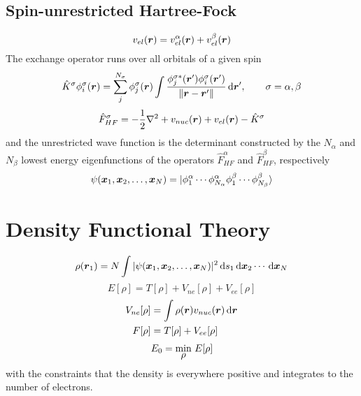 \subsection{Spin-unrestricted Hartree-Fock}
\begin{equation}
    v_{el}(\boldsymbol r) = v_{el}^\alpha (\boldsymbol r) + v_{el}^\beta (\boldsymbol r)
\end{equation}
The exchange operator runs over all orbitals of a given spin
\begin{equation}
    \hat{K}^\sigma\phi_i^\sigma(\boldsymbol r) 
	= \sum_j^{N_\sigma} \phi_j^\sigma (\boldsymbol r) 
	    \int \frac{\phi_j^{\sigma\ast}(\boldsymbol r')\phi_i^\sigma(\boldsymbol r')}
	    {\|\boldsymbol r - \boldsymbol r'\|} \,\mathrm{d} \boldsymbol r', \qquad \sigma = \alpha, \beta
\end{equation}
\begin{equation}
    \hat{F}_{HF}^\sigma = -\frac{1}{2}\nabla^2 + v_{nuc}(\boldsymbol r) + v_{el}(\boldsymbol r) - \hat{K}^\sigma 
\end{equation}
and the unrestricted wave function is the determinant constructed by the $N_\alpha$ and 
$N_\beta$ lowest energy eigenfunctions of the operators $\hat{F}_{HF}^\alpha$ and 
$\hat{F}_{HF}^\beta$, respectively
\begin{equation}
    \psi(\boldsymbol x_1,\boldsymbol x_2,\dots,\boldsymbol x_N) = 
    |\phi_1^\alpha\cdots\phi_{N_\alpha}^\alpha\phi_1^\beta\cdots\phi_{N_\beta}^\beta\rangle
\end{equation}

\section{Density Functional Theory} \label{sec:DFT}
\begin{equation}
    \rho(\boldsymbol r_1) = N \int |\psi(\boldsymbol x_1,\boldsymbol x_2,\dots,\boldsymbol x_N)|^2 
	\,\mathrm{d} s_1 \,\mathrm{d} \boldsymbol x_2 \cdots \,\mathrm{d} \boldsymbol x_N
\end{equation}
\begin{equation}
    E[\rho] = T[\rho] + V_{ne}[\rho] + V_{ee}[\rho]
\end{equation}
\begin{align}
    V_{ne}[\rho] &= \int \rho(\boldsymbol r)v_{nuc}(\boldsymbol r) \,\mathrm{d} \boldsymbol r\\
    F[\rho] &= T[\rho] + V_{ee}[\rho]
\end{align}
\begin{equation}
    E_0 = \mymin{\rho}\ E[\rho]
\end{equation}
with the constraints that the density is everywhere positive and integrates to the number
of electrons.

